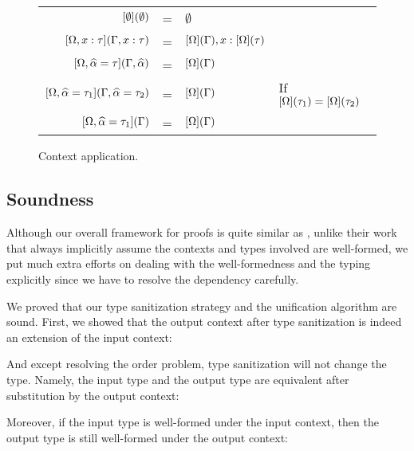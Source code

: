 \begin{figure*}[t]
  \centering
  \begin{tabular}{rlll}
    $[\emptyset](\emptyset)$ & = & $\emptyset$ \\
    $[\Omega, x: \tau](\Gamma, x: \tau)$ & = & $[\Omega](\Gamma), x : [\Omega](\tau) $
    \\
    $[\Omega, \widehat{\alpha} = \tau](\Gamma, \widehat{\alpha})$ & = & $[\Omega](\Gamma)$ \\
    $[\Omega, \widehat{\alpha} = \tau_1](\Gamma, \widehat{\alpha} = \tau_2)$ & = & $[\Omega](\Gamma)$
                                    & If $[\Omega](\tau_1) = [\Omega](\tau_2)$ \\
    $[\Omega, \widehat{\alpha} = \tau_1](\Gamma)$ & = & $[\Omega](\Gamma)$ \\
  \end{tabular}
    \caption{Context application.}
    \label{fig:context-application-on-context}
\end{figure*}

\subsection{Soundness}

Although our overall framework for proofs is quite similar as
\citet{dunfield2013complete}, unlike their work that always implicitly assume
the contexts and types involved are well-formed, we put much extra efforts on
dealing with the well-formedness and the typing explicitly since we have to resolve the dependency carefully.

We proved that our type sanitization strategy and the unification algorithm
are sound.
First, we showed that the output context after type
sanitization is indeed an extension of the input context:

\begin{lemma}[\TypeSanitizationExtensionName]
  \TypeSanitizationExtensionBody
\end{lemma}

And except resolving the order problem, type sanitization will not change the
type. Namely, the input type and the output type are equivalent after
substitution by the output context:

\begin{lemma}[\TypeSanitizationEquivalenceName]
  \TypeSanitizationEquivalenceBody
\end{lemma}

Moreover, if the input type is well-formed under the input context, then the
output type is still well-formed under the output context:

